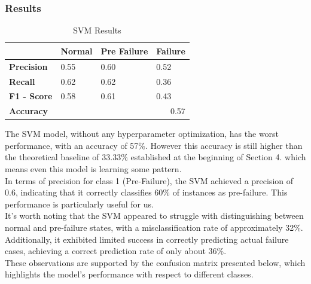 \documentclass{article}
\begin{document}
\subsubsection{Results}

\begin{table}[htbp]
\centering
\caption{SVM Results}
\begin{tabular}{|l|lll|}
\hline
                    & \multicolumn{1}{l|}{\textbf{Normal}} & \multicolumn{1}{l|}{\textbf{Pre Failure}} & \textbf{Failure} \\ \hline
\textbf{Precision}  & \multicolumn{1}{l|}{0.55}            & \multicolumn{1}{l|}{0.60}                 & 0.52             \\ \hline
\textbf{Recall}     & \multicolumn{1}{l|}{0.62}            & \multicolumn{1}{l|}{0.62}                 & 0.36             \\ \hline
\textbf{F1 - Score} & \multicolumn{1}{l|}{0.58}            & \multicolumn{1}{l|}{0.61}                 & 0.43             \\ \hline
\textbf{Accuracy}   & \multicolumn{3}{r|}{0.57}                                                                           \\ \hline
\end{tabular}
\end{table}

The SVM model, without any hyperparameter optimization, has the worst performance, with an accuracy of 57\%. However this accuracy is still higher than the theoretical baseline of 33.33\% established at the beginning of Section 4. which means even this model is learning some pattern.\\

In terms of precision for class 1 (Pre-Failure), the SVM achieved a precision of 0.6, indicating that it correctly classifies 60\% of instances as pre-failure. This performance is particularly useful for us.\\

It's worth noting that the SVM appeared to struggle with distinguishing between normal and pre-failure states, with a misclassification rate of approximately 32\%. Additionally, it exhibited limited success in correctly predicting actual failure cases, achieving a correct prediction rate of only about 36\%.\\

These observations are supported by the confusion matrix presented below, which highlights the model's performance with respect to different classes. \\
\end{document}
